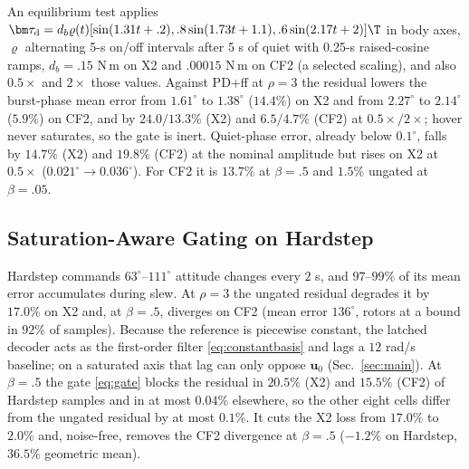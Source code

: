 \label{sec:disturbance}
An equilibrium test applies $\bm\tau_{\rm d}=d_b\varrho(t)[\sin(1.31t+.2),\allowbreak .8\sin(1.73t+1.1),\allowbreak.6\sin(2.17t+2)]\T$ in body axes, $\varrho$ alternating 5-s on/off intervals after 5 s of quiet with 0.25-s raised-cosine ramps, $d_b=.15$ N\,m on X2 and $.00015$ N\,m on CF2 (a selected scaling), and also $0.5\times$ and $2\times$ those values. Against PD+ff at $\rho=3$ the residual lowers the burst-phase mean error from $1.61^\circ$ to $1.38^\circ$ ($14.4\%$) on X2 and from $2.27^\circ$ to $2.14^\circ$ ($5.9\%$) on CF2, and by $24.0/13.3\%$ (X2) and $6.5/4.7\%$ (CF2) at $0.5\times/2\times$; hover never saturates, so the gate is inert. Quiet-phase error, already below $0.1^\circ$, falls by $14.7\%$ (X2) and $19.8\%$ (CF2) at the nominal amplitude but rises on X2 at $0.5\times$ ($0.021^\circ\to0.036^\circ$). For CF2 it is $13.7\%$ at $\beta=.5$ and $1.5\%$ ungated at $\beta=.05$.

\subsection{Saturation-Aware Gating on Hardstep}
\label{sec:failure}
Hardstep commands $63^\circ$--$111^\circ$ attitude changes every $2$ s, and $97$--$99\%$ of its mean error accumulates during slew. At $\rho=3$ the ungated residual degrades it by $17.0\%$ on X2 and, at $\beta=.5$, diverges on CF2 (mean error $136^\circ$, rotors at a bound in $92\%$ of samples). Because the reference is piecewise constant, the latched decoder acts as the first-order filter \eqref{eq:constantbasis} and lags a $12$ rad/s baseline; on a saturated axis that lag can only oppose $\bm u_0$ (Sec.~\ref{sec:main}). At $\beta=.5$ the gate \eqref{eq:gate} blocks the residual in $20.5\%$ (X2) and $15.5\%$ (CF2) of Hardstep samples and in at most $0.04\%$ elsewhere, so the other eight cells differ from the ungated residual by at most $0.1\%$. It cuts the X2 loss from $17.0\%$ to $2.0\%$ and, noise-free, removes the CF2 divergence at $\beta=.5$ ($-1.2\%$ on Hardstep, $36.5\%$ geometric mean).


